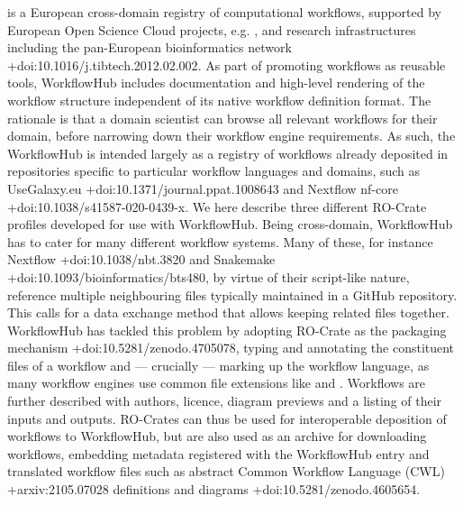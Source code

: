 \markdownRendererInterblockSeparator
{} is a European cross-domain registry of computational workflows, supported by European Open Science Cloud projects, e.g. , and research infrastructures including the pan-European bioinformatics network  +{}{}{doi:10.1016/j.tibtech.2012.02.002}. As part of promoting workflows as reusable tools, WorkflowHub includes documentation and high-level rendering of the workflow structure independent of its native workflow definition format. The rationale is that a domain scientist can browse all relevant workflows for their domain, before narrowing down their workflow engine requirements. As such, the WorkflowHub is intended largely as a registry of workflows already deposited in repositories specific to particular workflow languages and domains, such as UseGalaxy.eu +{}{}{doi:10.1371/journal.ppat.1008643} and Nextflow nf-core +{}{}{doi:10.1038/s41587-020-0439-x}. \markdownRendererInterblockSeparator
{}We here describe three different RO-Crate profiles developed for use with WorkflowHub.\markdownRendererInterblockSeparator
{}\markdownRendererInterblockSeparator
{}Being cross-domain, WorkflowHub has to cater for many different workflow systems. Many of these, for instance Nextflow +{}{}{doi:10.1038/nbt.3820} and Snakemake +{}{}{doi:10.1093/bioinformatics/bts480}, by virtue of their script-like nature, reference multiple neighbouring files typically maintained in a GitHub repository. This calls for a data exchange method that allows keeping related files together. WorkflowHub has tackled this problem by adopting RO-Crate as the packaging mechanism +{}{}{doi:10.5281/zenodo.4705078}, typing and annotating the constituent files of a workflow and — crucially — marking up the workflow language, as many workflow engines use common file extensions like  and . Workflows are further described with authors, licence, diagram previews and a listing of their inputs and outputs. RO-Crates can thus be used for interoperable deposition of workflows to WorkflowHub, but are also used as an archive for downloading workflows, embedding metadata registered with the WorkflowHub entry and translated workflow files such as abstract Common Workflow Language (CWL) +{}{}{arxiv:2105.07028} definitions and diagrams +{}{}{doi:10.5281/zenodo.4605654}. \markdownRendererInterblockSeparator

